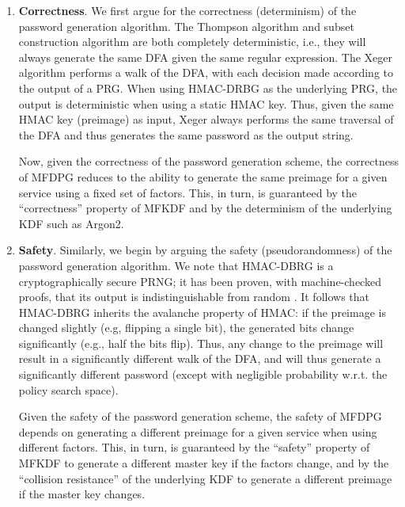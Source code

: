 \begin{enumerate}[leftmargin=*]
    \itemsep 1em
    \item \textbf{Correctness}. We first argue for the correctness (determinism) of the password generation algorithm.
    The Thompson algorithm \cite{thompson1968programming} and subset construction algorithm \cite{rabin1959finite} are both completely deterministic, i.e., they will always generate the same DFA given the same regular expression. The Xeger algorithm \cite{team2009xeger} performs a walk of the DFA, with each decision made according to the output of a PRG.
    When using HMAC-DRBG \cite{barker_recommendation_2015} as the underlying PRG, the output is deterministic when using a static HMAC key.
    Thus, given the same HMAC key (preimage) as input, Xeger always performs the same traversal of the DFA and thus generates the same password as the output string.
    
    \medskip

    Now, given the correctness of the password generation scheme, the correctness of MFDPG reduces to the ability to generate the same preimage for a given service using a fixed set of factors. This, in turn, is guaranteed by the ``correctness'' property of MFKDF and by the determinism of the underlying KDF such as Argon2.
    
    \item \textbf{Safety}. Similarly, we begin by arguing the safety (pseudorandomness) of the password generation algorithm. We note that HMAC-DBRG \cite{barker_recommendation_2015} is a cryptographically secure PRNG; it has been proven, with machine-checked proofs, that its output is indistinguishable from random \cite{ye2016notorious}. It follows that HMAC-DBRG inherits the avalanche property of HMAC: if the preimage is changed slightly (e.g, flipping a single bit), the generated bits change significantly (e.g., half the bits flip). Thus, any change to the preimage will result in a significantly different walk of the DFA, and will thus generate a significantly different password (except with negligible probability w.r.t. the policy search space).
    
    \medskip

    Given the safety of the password generation scheme, the safety of MFDPG depends on generating a different preimage for a given service when using different factors. This, in turn, is guaranteed by the ``safety'' property of MFKDF to generate a different master key if the factors change, and by the ``collision resistance'' of the underlying KDF to generate a different preimage if the master key changes.


\end{enumerate}
